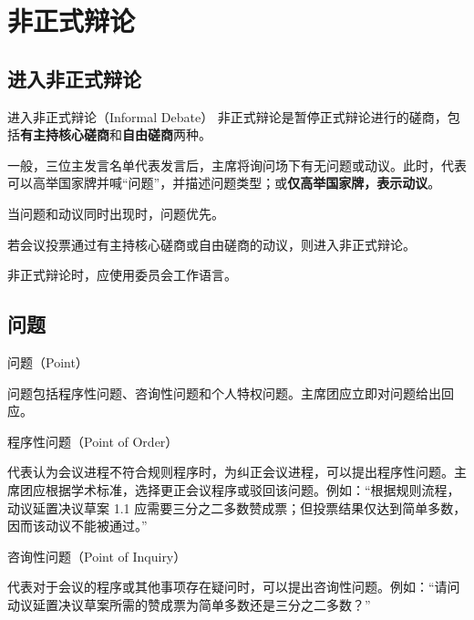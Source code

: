 \documentclass{beamer}
\begin{document}
\section{非正式辩论}

\subsection{进入非正式辩论}

\begin{frame}{进入非正式辩论（Informal Debate）}
非正式辩论是暂停正式辩论进行的磋商，包括\textbf{有主持核心磋商}和\textbf{自由磋商}两种。

一般，三位主发言名单代表发言后，主席将询问场下有无问题或动议。此时，代表可以高举国家牌并喊“问题”，并描述问题类型；或\textbf{仅高举国家牌，表示动议}。

当问题和动议同时出现时，问题优先。

若会议投票通过有主持核心磋商或自由磋商的动议，则进入非正式辩论。

非正式辩论时，应使用委员会工作语言。
\end{frame}

\subsection{问题}

\begin{frame}{问题（Point）}

问题包括程序性问题、咨询性问题和个人特权问题。主席团应立即对问题给出回应。

\end{frame}

\begin{frame}{程序性问题（Point of Order）}

代表认为会议进程不符合规则程序时，为纠正会议进程，可以提出程序性问题。主席团应根据学术标准，选择更正会议程序或驳回该问题。例如：“根据规则流程，动议延置决议草案 1.1 应需要三分之二多数赞成票；但投票结果仅达到简单多数，因而该动议不能被通过。”

\end{frame}

\begin{frame}{咨询性问题（Point of Inquiry）}

代表对于会议的程序或其他事项存在疑问时，可以提出咨询性问题。例如：“请问动议延置决议草案所需的赞成票为简单多数还是三分之二多数？”

\end{frame}
\end{document}
